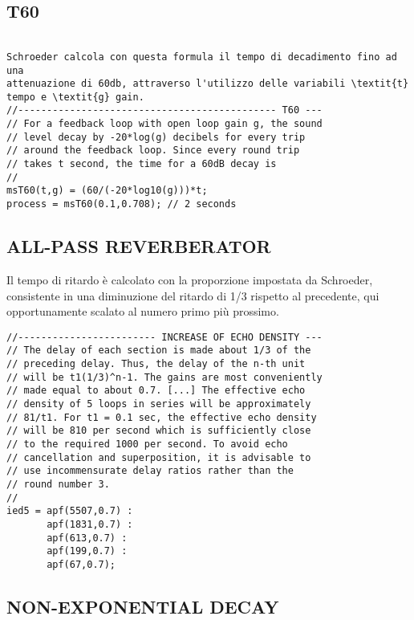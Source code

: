 \subsection*{T60}
\begin{lstlisting}

Schroeder calcola con questa formula il tempo di decadimento fino ad una
attenuazione di 60db, attraverso l'utilizzo delle variabili \textit{t}
tempo e \textit{g} gain.
//--------------------------------------------- T60 ---
// For a feedback loop with open loop gain g, the sound
// level decay by -20*log(g) decibels for every trip
// around the feedback loop. Since every round trip
// takes t second, the time for a 60dB decay is
//
msT60(t,g) = (60/(-20*log10(g)))*t;
process = msT60(0.1,0.708); // 2 seconds
\end{lstlisting}

\subsection*{ALL-PASS REVERBERATOR}

Il tempo di ritardo è calcolato con la proporzione impostata da Schroeder,
consistente in una diminuzione del ritardo di 1/3 rispetto al precedente,
qui opportunamente scalato al numero primo più prossimo.

\begin{lstlisting}
//------------------------ INCREASE OF ECHO DENSITY ---
// The delay of each section is made about 1/3 of the
// preceding delay. Thus, the delay of the n-th unit
// will be t1(1/3)^n-1. The gains are most conveniently
// made equal to about 0.7. [...] The effective echo
// density of 5 loops in series will be approximately
// 81/t1. For t1 = 0.1 sec, the effective echo density
// will be 810 per second which is sufficiently close
// to the required 1000 per second. To avoid echo
// cancellation and superposition, it is advisable to
// use incommensurate delay ratios rather than the
// round number 3.
//
ied5 = apf(5507,0.7) :
       apf(1831,0.7) :
       apf(613,0.7) :
       apf(199,0.7) :
       apf(67,0.7);
\end{lstlisting}

\subsection*{NON-EXPONENTIAL DECAY}

